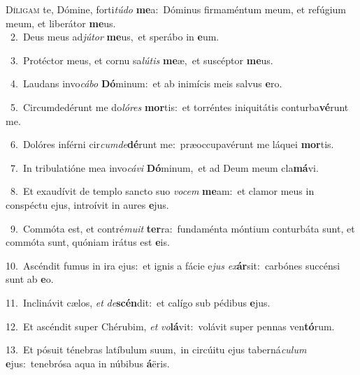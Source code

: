 \lettrine{\initial\textcolor{\initialcolor}{D}}{íligam} te, Dómine, forti\-\textit{tú}\-\textit{do} \textbf{me}\-a:~\star Dóminus firmaméntum meum, et refúgium meum, et liberátor \textbf{me}\-us.\\
{\numbfont\textcolor{\numbcolor}{~2.}}~Deus meus ad\-\textit{jú}\-\textit{tor} \textbf{me}\-us,~\star et sperábo in \textbf{e}\-um.\par
{\numbfont\textcolor{\numbcolor}{~3.}}~Protéctor meus, et cornu sa\-\textit{lú}\-\textit{tis} \textbf{me}\-æ,~\star et suscéptor \textbf{me}\-us.\par
{\numbfont\textcolor{\numbcolor}{~4.}}~Laudans invo\-\textit{cá}\-\textit{bo} \textbf{Dó}\-minum:~\star et ab inimícis meis salvus \textbf{e}\-ro.\par
{\numbfont\textcolor{\numbcolor}{~5.}}~Circumdedérunt me do\-\textit{ló}\-\textit{res} \textbf{mor}\-tis:~\star et torréntes iniquitátis conturba\-\textbf{vé}\-runt me.\par
{\numbfont\textcolor{\numbcolor}{~6.}}~Dolóres inférni cir\-\textit{cum}\-\textit{de}\textbf{dé}runt me:~\star præoccupavérunt me láquei \textbf{mor}\-tis.\par
{\numbfont\textcolor{\numbcolor}{~7.}}~In tribulatióne mea invo\-\textit{cá}\-\textit{vi} \textbf{Dó}\-minum,~\star et ad Deum meum cla\-\textbf{má}\-vi.\par
{\numbfont\textcolor{\numbcolor}{~8.}}~Et exaudívit de templo sancto suo \textit{vo}\-\textit{cem} \textbf{me}\-am:~\star et clamor meus in conspéctu ejus, introívit in aures \textbf{e}\-jus.\par
{\numbfont\textcolor{\numbcolor}{~9.}}~Commóta est, et contré\-\textit{mu}\-\textit{it} \textbf{ter}\-ra:~\star fundaménta móntium conturbáta sunt, et commóta sunt, quóniam irátus est \textbf{e}\-is.\par
{\numbfont\textcolor{\numbcolor}{10.}}~Ascéndit fumus in ira ejus:~\dagger et ignis a fácie e\textit{jus} \textit{ex}\-\textbf{ár}sit:~\star carbónes succénsi sunt ab \textbf{e}\-o.\par
{\numbfont\textcolor{\numbcolor}{11.}}~Inclinávit cælos, \textit{et} \textit{de}\-\textbf{scén}dit:~\star et calígo sub pédibus \textbf{e}\-jus.\par
{\numbfont\textcolor{\numbcolor}{12.}}~Et ascéndit super Chérubim, \textit{et} \textit{vo}\-\textbf{lá}vit:~\star volávit super pennas ven\-\textbf{tó}\-rum.\par
{\numbfont\textcolor{\numbcolor}{13.}}~Et pósuit ténebras latíbulum suum,~\dagger in circúitu ejus taberná\-\textit{cu}\-\textit{lum} \textbf{e}\-jus:~\star tenebrósa aqua in núbibus \textbf{á}\-ëris.\par
